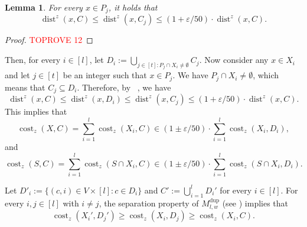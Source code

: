 \documentclass[letterpaper,11pt]{article}
\theoremstyle{plain}
\newtheorem{lemma}[theorem]{Lemma}
\theoremstyle{definition}
\theoremstyle{remark}
\DeclareMathOperator{\cost}{cost}
\DeclareMathOperator{\dist}{dist}
\newcommand{\dup}{\mathrm{dup}}
\newcommand{\eps}{\varepsilon}
\begin{document}
\begin{lemma}
\label{claim:C_j}
For every $x\in P_j$, it holds that 
\begin{equation*}
    \dist^z(x,C)\le \dist^z(x, C_j)\le (1+\eps/50)\cdot \dist^z(x,C).
\end{equation*}
\end{lemma}
\begin{proof}\textcolor{red}{TOPROVE 12}\end{proof}

Then, for every $i\in [l]$, let $D_i:=\bigcup_{j\in [t]: P_j\cap X_i\neq \emptyset} C_j$.
Now consider any $x\in X_i$ and let $j\in [t]$ be an integer such that $x\in P_j$. We have $P_j\cap X_i\neq \emptyset$, which means that $C_j\subseteq D_i$. Therefore, by ~, we have
\begin{equation}
\label{eq:Di}
\dist^z(x,C)\le \dist^z(x,D_i)\le \dist^z(x,C_j)\le (1+\eps/50)\cdot \dist^z(x,C).
\end{equation}
This implies that 
\begin{equation}
\label{eq:cost P_i}
\cost_z(X,C) = \sum_{i=1}^l \cost_z(X_i,C) \in (1\pm\eps/50)\cdot \sum_{i=1}^l\cost_z(X_i,D_i),
\end{equation}
and
\begin{equation}
\label{eq:cost S_X}
\cost_z(S,C) = \sum_{i=1}^l\cost_z(S\cap X_i,C)\in (1\pm \eps/50)\cdot \sum_{i=1}^l\cost_z(S\cap X_i,D_i).
\end{equation}

Let $D'_i:=\{(c,i)\in V\times [l]:c\in D_i\}$ and $C':=\bigcup_{i=1}^l D_i'$ for every $i\in[l]$. For every $i,j\in [l]$ with $i\neq j$, the separation property of $M^\dup_{l,w}$ (see ) implies that 
\begin{equation*}
\cost_z(X_i',D_j')\ge \cost_z(X_i,D_j)\ge \cost_z(X_i,C).
\end{equation*}
\end{document}
